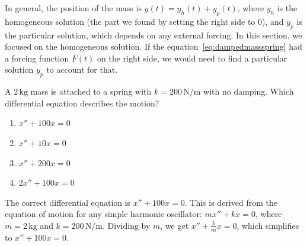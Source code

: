 In general, the position of the mass is $y(t) = y_{h}(t) + y_{p}(t)$, where $y_{h}$ is the homogeneous solution (the part we found by setting the right side to $0$), and $y_{p}$ is
the particular solution, which depends on any external forcing. In
this section, we focused on the homogeneous solution. If the equation~\eqref{eq:dampedmassspring}
had a forcing function $F(t)$ on the right side, we would need to find a
particular solution $y_{p}$ to account for that.

\begin{Exercise}
	[title={Linear Systems 1}, label={ex:id_diff_eq}]

	A $2 \, \text{kg}$ mass is attached to a spring with $k=200 \, \text{N/m}$ with
	no damping. Which differential equation describes the motion?

	\begin{enumerate}
		\item $x'' + 100x = 0$

		\item $x'' + 10x = 0$

		\item $x'' + 200x = 0$

		\item $2x'' + 100x = 0$
	\end{enumerate}
\end{Exercise}
\begin{Answer}
	[ref={ex:id_diff_eq}] The correct differential equation is $x'' + 100x = 0$.
	This is derived from the equation of motion for any simple harmonic oscillator:
	$m x'' + k x = 0$, where $m = 2 \, \text{kg}$ and $k = 200 \, \text{N/m}$. Dividing
	by $m$, we get $x'' + \frac{k}{m}x = 0$, which simplifies to $x'' + 100x = 0$.
\end{Answer}

